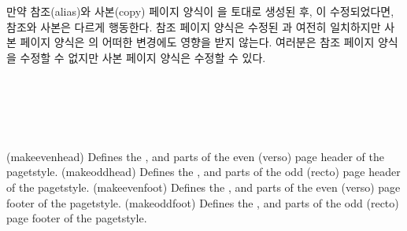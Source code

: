 만약 참조(alias)와 사본(copy) 페이지 양식이 을 토대로 생성된 후,
이 수정되었다면, 참조와 사본은 다르게 행동한다.
참조 페이지 양식은 수정된 과 여전히 일치하지만 사본 페이지
양식은 의 어떠한 변경에도 영향을 받지 않는다.
여러분은 참조 페이지 양식을 수정할 수 없지만 사본 페이지 양식은 수정할 수 있다.

\begin{syntax}
\cmd{\makeevenhead} \\
\cmd{\makeoddhead} \\
\cmd{\makeevenfoot} \\
\cmd{\makeoddfoot} \\
\end{syntax}
\glossary(makeevenhead)%
  {}%
  {Defines the ,  and  parts of the
   even (verso) page header of the  pagetstyle.}
\glossary(makeoddhead)%
  {}%
  {Defines the ,  and  parts of the
   odd (recto) page header of the  pagetstyle.}
\glossary(makeevenfoot)%
  {}%
  {Defines the ,  and  parts of the
   even (verso) page footer of the  pagetstyle.}
\glossary(makeoddfoot)%
  {}%
  {Defines the ,  and  parts of the
   odd (recto) page footer of the  pagetstyle.}
